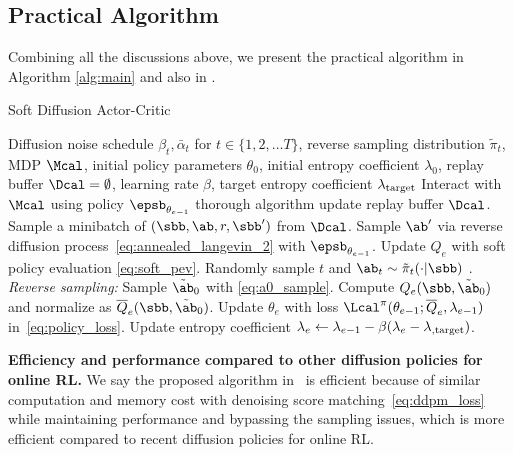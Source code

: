 \subsection{Practical Algorithm}
Combining all the discussions above, we present the practical algorithm in Algorithm \ref{alg:main} and also in . 
\begin{algorithm}
    \caption{Soft Diffusion Actor-Critic~\label{alg:main}}
    \begin{algorithmic}[1]
        \REQUIRE Diffusion noise schedule $\beta_t, \bar\alpha_t$ for $t\in \{1,2,\dots T\}$, reverse sampling distribution $\tilde\pi_t$, MDP $\Mcal$, initial policy parameters $\theta_0$, initial entropy coefficient $\lambda_0$, replay buffer $\Dcal=\emptyset$, learning rate $\beta$, target entropy coefficient $\lambda_{\rm target}$
        \STATE {}
        \STATE Interact with $\Mcal$ using policy $\epsb_{\theta_{e-1}}$ thorough algorithm update replay buffer $\Dcal$.
        \STATE Sample a minibatch of $(\sbb, \ab, r, \sbb')$ from $\Dcal$.
        \STATE {}
        \STATE  Sample $\ab'$ via reverse diffusion process~\eqref{eq:annealed_langevin_2} with $\epsb_{\theta_{e-1}}$.\label{lst:line:sample}
        \STATE Update $Q_e$ with soft policy evaluation \eqref{eq:soft_pev}.
        \STATE {}
        \STATE Randomly sample $t$ and $\ab_t\sim \tilde\pi_t(\cdot|\sbb)$ .
        \STATE \emph{Reverse sampling:} Sample $\tilde\ab_0$ with \eqref{eq:a0_sample}.
        \STATE Compute $Q_e(\sbb,\tilde\ab_0)$ and normalize as $\overline Q_e(\sbb,\tilde\ab_0)$.
        \STATE Update $\theta_e$ with loss $\Lcal^\pi(\theta_{e-1};\overline{Q}_e,\lambda_{e-1})$ in~\eqref{eq:policy_loss}.
        \STATE Update entropy coefficient $\lambda_e\leftarrow \lambda_{e-1} - \beta (\lambda_e -\lambda_{\rm, target})$.
        \ENDFOR
    \end{algorithmic}
\end{algorithm}
\vspace{-10pt}

\textbf{Efficiency and performance compared to other diffusion policies for online RL.} We say the proposed \algabb algorithm in~ is efficient because of similar computation and memory cost with denoising score matching~\eqref{eq:ddpm_loss} while maintaining performance and bypassing the sampling issues, which is more efficient compared to recent diffusion policies for online RL.

